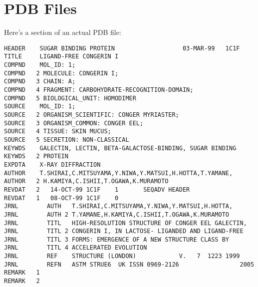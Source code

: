 \section{PDB Files}
Here's a section of an actual PDB file:

\begin{lstlisting}
HEADER    SUGAR BINDING PROTEIN                   03-MAR-99   1C1F              
TITLE     LIGAND-FREE CONGERIN I                                                
COMPND    MOL_ID: 1;                                                            
COMPND   2 MOLECULE: CONGERIN I;                                                
COMPND   3 CHAIN: A;                                                            
COMPND   4 FRAGMENT: CARBOHYDRATE-RECOGNITION-DOMAIN;                           
COMPND   5 BIOLOGICAL_UNIT: HOMODIMER                                           
SOURCE    MOL_ID: 1;                                                            
SOURCE   2 ORGANISM_SCIENTIFIC: CONGER MYRIASTER;                               
SOURCE   3 ORGANISM_COMMON: CONGER EEL;                                         
SOURCE   4 TISSUE: SKIN MUCUS;                                                  
SOURCE   5 SECRETION: NON-CLASSICAL                                             
KEYWDS    GALECTIN, LECTIN, BETA-GALACTOSE-BINDING, SUGAR BINDING               
KEYWDS   2 PROTEIN                                                              
EXPDTA    X-RAY DIFFRACTION                                                     
AUTHOR    T.SHIRAI,C.MITSUYAMA,Y.NIWA,Y.MATSUI,H.HOTTA,T.YAMANE,                
AUTHOR   2 H.KAMIYA,C.ISHII,T.OGAWA,K.MURAMOTO                                  
REVDAT   2   14-OCT-99 1C1F    1       SEQADV HEADER                            
REVDAT   1   08-OCT-99 1C1F    0                                                
JRNL        AUTH   T.SHIRAI,C.MITSUYAMA,Y.NIWA,Y.MATSUI,H.HOTTA,                
JRNL        AUTH 2 T.YAMANE,H.KAMIYA,C.ISHII,T.OGAWA,K.MURAMOTO                 
JRNL        TITL   HIGH-RESOLUTION STRUCTURE OF CONGER EEL GALECTIN,            
JRNL        TITL 2 CONGERIN I, IN LACTOSE- LIGANDED AND LIGAND-FREE             
JRNL        TITL 3 FORMS: EMERGENCE OF A NEW STRUCTURE CLASS BY                 
JRNL        TITL 4 ACCELERATED EVOLUTION                                        
JRNL        REF    STRUCTURE (LONDON)            V.   7  1223 1999              
JRNL        REFN   ASTM STRUE6  UK ISSN 0969-2126                 2005          
REMARK   1                                                                      
REMARK   2                                                                      

\end{lstlisting}
